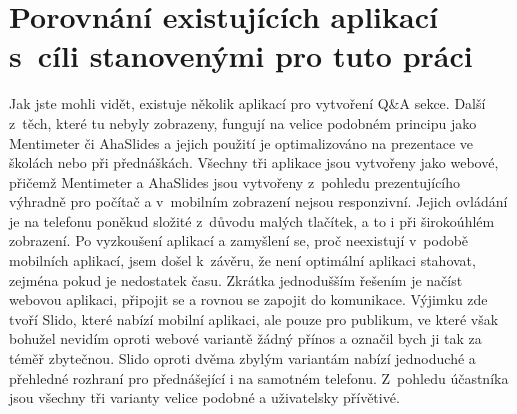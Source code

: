 \section{Porovnání existujících aplikací s~cíli stanovenými pro tuto práci}
Jak jste mohli vidět, existuje několik aplikací pro vytvoření Q\&A sekce. Další z~těch, které tu nebyly zobrazeny, fungují na velice podobném principu jako Mentimeter či AhaSlides a jejich použití je optimalizováno na prezentace ve školách nebo při přednáškách. Všechny tři aplikace jsou vytvořeny jako webové, přičemž Mentimeter a AhaSlides jsou vytvořeny z~pohledu prezentujícího výhradně pro počítač a v~mobilním zobrazení nejsou responzivní. Jejich ovládání je na telefonu poněkud složité z~důvodu malých tlačítek, a to i při širokoúhlém zobrazení. Po vyzkoušení aplikací a zamyšlení se, proč neexistují v~podobě mobilních aplikací, jsem došel k~závěru, že není optimální aplikaci stahovat, zejména pokud je nedostatek času. Zkrátka jednodušším řešením je načíst webovou aplikaci, připojit se a rovnou se zapojit do komunikace. Výjimku zde tvoří Slido, které nabízí mobilní aplikaci, ale pouze pro publikum, ve které však bohužel nevidím oproti webové variantě žádný přínos a označil bych ji tak za téměř zbytečnou. Slido oproti dvěma zbylým variantám nabízí jednoduché a přehledné rozhraní pro přednášející i na samotném telefonu. Z~pohledu účastníka jsou všechny tři varianty velice podobné a uživatelsky přívětivé.  

